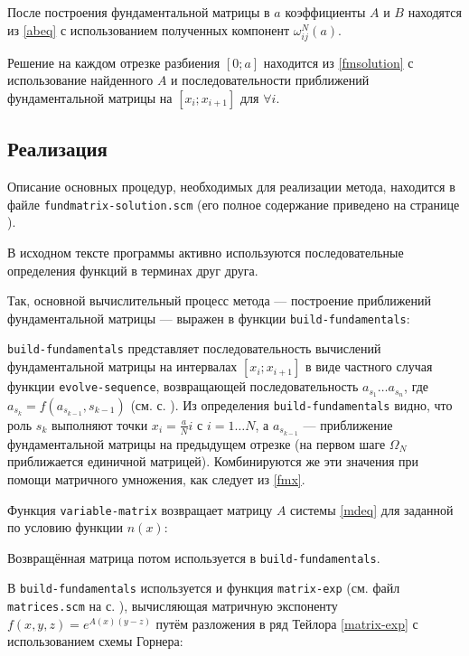 \documentclass{article}
\newcommand{\filename}[1]{\texttt{#1}}
\newcommand{\procname}[1]{\texttt{#1}}
\numberwithin{equation}{section}
\begin{document}
После построения фундаментальной матрицы в $a$ коэффициенты $A$ и $B$
находятся из \eqref{abeq} с использованием полученных компонент
$\omega_{ij}^N(a)$.

Решение на каждом отрезке разбиения $[0; a]$ находится из
\eqref{fmsolution} с использование найденного $A$ и последовательности
приближений фундаментальной матрицы на $[x_i; x_{i+1}]$ для $\forall
i$.

\newpage
\subsection{Реализация}

Описание основных процедур, необходимых для реализации метода,
находится в файле \filename{fundmatrix-solution.scm} (его полное содержание
приведено на странице \pageref{fundmatrix-solution.scm-full-listing}).

В исходном тексте программы активно используются последовательные
определения функций в терминах друг друга.

Так, основной вычислительный процесс метода — построение приближений
фундаментальной матрицы — выражен в функции
\procname{build-fundamentals}:



\procname{build-fundamentals} представляет последовательность вычислений
фундаментальной матрицы на интервалах $[x_i; x_{i+1}]$ в виде частного
случая функции \procname{evolve-sequence}, возвращающей
последовательность $a_{s_1} \ldots a_{s_n}$, где $a_{s_k} =
f(a_{s_{k-1}}, s_{k-1})$
(см. с. \pageref{shared.scm-full-listing}). Из определения
\procname{build-fundamentals} видно, что роль $s_k$ выполняют точки $x_i
= \frac{a}{N}i$ с $i = 1 \ldots N$, а $a_{s_{k-1}}$ — приближение
фундаментальной матрицы на предыдущем отрезке (на первом шаге
$\Omega_N$ приближается единичной матрицей). Комбинируются же эти
значения при помощи матричного умножения, как следует из \eqref{fmx}.

Функция \procname{variable-matrix} возвращает матрицу $A$ системы
\eqref{mdeq} для заданной по условию функции $n(x)$:



Возвращённая матрица потом используется в \procname{build-fundamentals}.

В \procname{build-fundamentals} используется и функция
\procname{matrix-exp} (см. файл \filename{matrices.scm} на
с. \pageref{matrices.scm-full-listing}), вычисляющая матричную
экспоненту $f(x, y, z) = e^{A(x)(y-z)}$ путём разложения в ряд Тейлора
\eqref{matrix-exp} с использованием схемы Горнера:
\end{document}
